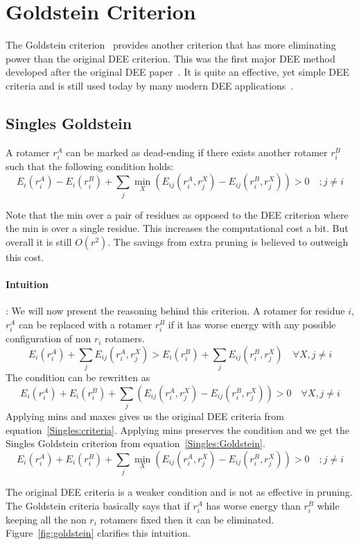 \documentclass[a4]{article}
\begin{document}
\section{Goldstein Criterion}
The Goldstein criterion~\cite{Goldstein1994} provides another criterion that has more eliminating power than the original DEE criterion. This was the first major DEE method developed after the original DEE paper~\cite{Desmet1992}. It is quite an effective, yet simple DEE criteria and is still used today by many modern DEE applications~\cite{Multistate}. 

\subsection{Singles Goldstein}
A rotamer $r_i^A$ can be marked as dead-ending if there exists another rotamer $r_i^B$ such that the following condition holds:
\begin{equation}
\label{Singles:Goldstein}
E_i(r_i^A) - E_i(r_i^B) + \sum_j \min_X \left(E_{ij}(r_i^A,r_j^X)-E_{ij}(r_i^B,r_j^X) \right) > 0  \quad   ; j \neq i
\end{equation}

Note that the min over a pair of residues as opposed to the DEE criterion where the min is over a single residue. This increases the computational cost a bit. But overall it is still $O(r^2)$. The savings from extra pruning is believed to outweigh this cost. 

\paragraph{Intuition}: We will now present the reasoning behind this criterion. A rotamer for residue $i$, $r_i^A$ can be replaced with a rotamer $r_i^B$ if it has worse energy with any possible configuration of non $r_i$ rotamers. 
\[
E_i(r_i^A) + \sum_j E_{ij}(r_i^A,r_j^X) >  E_i(r_i^B) + \sum_j E_{ij}(r_i^B,r_j^X) \quad \forall X, j\neq i
\]
The condition can be rewritten as
\[
E_i(r_i^A) + E_i(r_i^B) + \sum_j \left( E_{ij}(r_i^A,r_j^X) - E_{ij}(r_i^B,r_j^X) \right) >  0 \quad \forall X, j \neq i
\]
Applying mins and maxes gives us the original DEE criteria from equation~\ref{Singles:criteria}. Applying mins preserves the condition and we get the Singles Goldstein criterion from equation~\ref{Singles:Goldstein}.
\[
E_i(r_i^A) + E_i(r_i^B) + \sum_j \min_X \left( E_{ij}(r_i^A,r_j^X) - E_{ij}(r_i^B,r_j^X) \right) >  0 \quad ;j\neq i
\]

The original DEE criteria is a weaker condition and is not as effective in pruning. The Goldstein criteria basically says that if $r_i^A$ has worse energy than $r_i^B$ while keeping all the non $r_i$ rotamers fixed then it can be eliminated. Figure~\ref{fig:goldstein} clarifies this intuition. 
\end{document}
